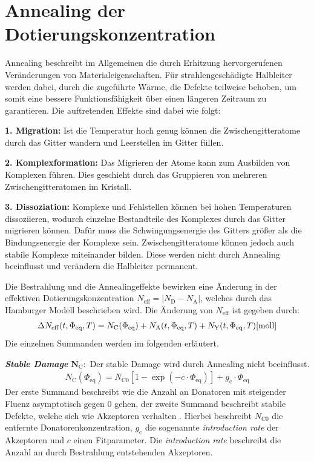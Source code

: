 \section{Annealing der Dotierungskonzentration}
Annealing beschreibt im Allgemeinen die durch Erhitzung hervorgerufenen Veränderungen von Materialeigenschaften. Für strahlengeschädigte
Halbleiter werden dabei, durch die zugeführte Wärme, die Defekte teilweise behoben, um somit eine
bessere Funktionsfähigkeit über einen längeren Zeitraum zu garantieren. Die auftretenden Effekte sind dabei wie folgt:

\textbf{1. Migration:} Ist die Temperatur hoch genug können die Zwischengitteratome durch das Gitter wandern und
Leerstellen im Gitter füllen.

\textbf{2. Komplexformation:} Das Migrieren der Atome kann zum Ausbilden von Komplexen führen. Dies geschieht durch das
Gruppieren von mehreren Zwischengitteratomen im Kristall.

\textbf{3. Dissoziation:} Komplexe und Fehlstellen können bei hohen Temperaturen dissoziieren, wodurch einzelne Bestandteile des Komplexes
durch das Gitter migrieren können. Dafür muss die Schwingungsenergie des Gitters größer als die Bindungsenergie der Komplexe sein.
Zwischengitteratome können jedoch auch stabile Komplexe miteinander bilden.
Diese werden nicht durch Annealing
beeinflusst und verändern die Halbleiter permanent.

Die Bestrahlung und die Annealingeffekte bewirken eine Änderung in der effektiven Dotierungskonzentration
${N_{\mathrm{eff}}= |N_{\mathrm{D}}-N_{\mathrm{A}}|}$,
welches durch das Hamburger Modell beschrieben wird.
Die Änderung von $N_{\mathrm{eff}}$ ist gegeben durch:
\begin{align}
  \Delta N_{\mathrm{eff}}(t, \Phi_{\mathrm{eq}}, T)   = N_{\mathrm{C}}(\Phi_{\mathrm{eq}}) + N_{\mathrm{A}}(t, \Phi_{\mathrm{eq}}, T) + N_{\mathrm{Y}}(t, \Phi_{\mathrm{eq}}, T) \text{\cite{moll}}
  \label{eqn:N_eff}
\end{align}
Die einzelnen Summanden werden im folgenden erläutert.

\textbf{\textit{Stable Damage}} $\symbf{N_{\mathrm{C}}}:$ Der stable Damage wird durch Annealing nicht beeinflusst.
\begin{align}
  N_{\mathrm{C}}(\Phi_{\mathrm{eq}}) = N_{\mathrm{C0}}[1-\exp{(-c \cdot \Phi_{\mathrm{eq}})}] + g_{\mathrm{c}} \cdot \Phi_{\mathrm{eq}}
\end{align}
Der erste Summand beschreibt wie die Anzahl an Donatoren mit
steigender Fluenz asymptotisch gegen 0 gehen, der zweite Summand beschreibt stabile Defekte, welche sich wie Akzeptoren verhalten \cite{beyer}.
Hierbei beschreibt $N_{\mathrm{C0}}$ die entfernte Donatorenkonzentration, $g_{\mathrm{c}}$ die sogenannte \textit{introduction rate} der Akzeptoren und $c$ einen Fitparameter.
Die \textit{introduction rate} beschreibt die Anzahl an durch Bestrahlung entstehenden Akzeptoren.

